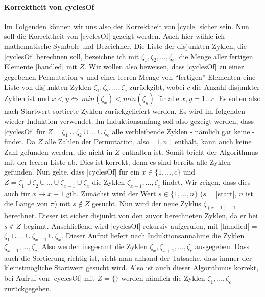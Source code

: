 \paragraph{Korrektheit von cyclesOf}
Im Folgenden können wir uns also der Korrektheit von |cycle| sicher sein. Nun soll die Korrektheit von |cyclesOf| gezeigt werden.
Auch hier wähle ich mathematische Symbole und Bezeichner.
Die Liste der disjunkten Zyklen, die |cyclesOf| berechnen soll, bezeichne ich mit $\zeta_1, \zeta_2, \dots, \zeta_c$, die Menge aller fertigen Elemente |handled| mit $Z$.
Wir wollen also beweisen, dass |cyclesOf| zu einer gegebenen Permutation $\pi$ und einer leeren Menge von ``fertigen'' Elementen eine Liste
von disjunkten Zyklen $\zeta_1, \zeta_2, \dots, \zeta_c$ zurückgibt, wobei $c$ die Anzahl disjunkter Zyklen ist und $x < y \Leftrightarrow \ min(\zeta_x) < min(\zeta_y)$ für alle $x,y=1 \dots c$.
Es sollen also nach Startwert sortierte Zyklen zurückgeliefert werden.
Es wird im folgenden wieder Induktion verwendet.
Im Induktionsanfang soll also gezeigt werden, dass |cyclesOf| für $Z = \zeta_1 \cup \zeta_2 \cup \dots \cup \zeta_c$ alle verbleibende Zyklen - nämlich gar keine - findet.
Da $Z$ alle Zahlen der Permutation, also $[1,n]$ enthält, kann auch keine Zahl gefunden werden, die nicht in $Z$ enthalten ist. Somit bricht der Algorithmus mit der leeren Liste ab.
Dies ist korrekt, denn es sind bereits alle Zyklen gefunden.
Nun gelte, dass |cyclesOf| für ein $x \in \{1, \dots, c\}$ und $Z = \zeta_1 \cup \zeta_2 \cup \dots \cup \zeta_{x-1} \cup \zeta_x$ die Zyklen $\zeta_{x+1}, \dots, \zeta_c$ findet.
Wir zeigen, dass dies auch für $x \rightarrow x-1$ gilt.
Zunächst wird der Wert $s \in \{1, \dots, n\}$ ($s=$|start|, $n$ ist die Länge von $\pi$) mit $s \notin Z$ gesucht.
Nun wird der neue Zyklus $\zeta_{(x-1)+1}$ berechnet. Dieser ist sicher disjunkt von den zuvor berechneten Zyklen, da er bei $s \notin Z$ beginnt.
Anschließend wird |cyclesOf| rekursiv aufgerufen, mit |handled| = $\zeta_1 \cup \dots \cup \zeta_{x-1} \cup \zeta_{x}$.
Dieser Aufruf liefert nach Induktionsannahme die Zyklen $\zeta_{x+1}, \dots, \zeta_c$.
Also werden insgesamt die Zyklen $\zeta_{x}, \zeta_{x+1}, \dots, \zeta_c$ ausgegeben.
Dass auch die Sortierung richtig ist, sieht man anhand der Tatsache, dass immer der kleinstmögliche Startwert gesucht wird.
Also ist auch dieser Algorithmus korrekt, bei Aufruf von |cyclesOf| mit $Z = \{\}$ werden nämlich die Zyklen $\zeta_1, \dots, \zeta_c$ zurückgegeben.
